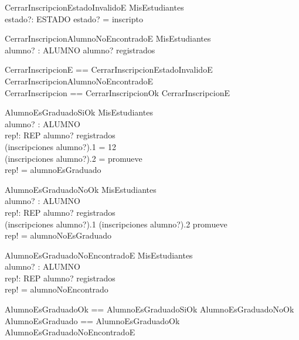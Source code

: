 \begin{schema}{CerrarInscripcionEstadoInvalidoE}
    \Xi MisEstudiantes \\
    estado?: ESTADO
    \where
    estado? = inscripto
\end{schema}

\begin{schema}{CerrarInscripcionAlumnoNoEncontradoE}
    \Xi MisEstudiantes \\
    alumno? : ALUMNO
    \where
    alumno? \notin registrados
\end{schema}

\begin{zed}
    CerrarInscripcionE == CerrarInscripcionEstadoInvalidoE \lor CerrarInscripcionAlumnoNoEncontradoE \\
    CerrarInscripcion == CerrarInscripcionOk \lor CerrarInscripcionE
\end{zed}

\begin{schema}{AlumnoEsGraduadoSiOk}
    \Xi MisEstudiantes \\
    alumno? : ALUMNO \\
    rep!: REP
    \where
    alumno? \in registrados \\
    (inscripciones \; alumno?).1 = 12 \\
    (inscripciones \; alumno?).2 = promueve \\
    rep! = alumnoEsGraduado
\end{schema}

\begin{schema}{AlumnoEsGraduadoNoOk}
    \Xi MisEstudiantes \\
    alumno? : ALUMNO \\
    rep!: REP
    \where
    alumno? \in registrados \\
    (inscripciones \; alumno?).1  \lor (inscripciones \; alumno?).2 \neq promueve \\
    rep! = alumnoNoEsGraduado
\end{schema}

\begin{schema}{AlumnoEsGraduadoNoEncontradoE}
    \Xi MisEstudiantes \\
    alumno? : ALUMNO \\
    rep!: REP
    \where
    alumno? \notin registrados \\
    rep! = alumnoNoEncontrado
\end{schema}

\begin{zed}
    AlumnoEsGraduadoOk == AlumnoEsGraduadoSiOk \lor AlumnoEsGraduadoNoOk \\
    AlumnoEsGraduado == AlumnoEsGraduadoOk \lor AlumnoEsGraduadoNoEncontradoE \\
\end{zed}

